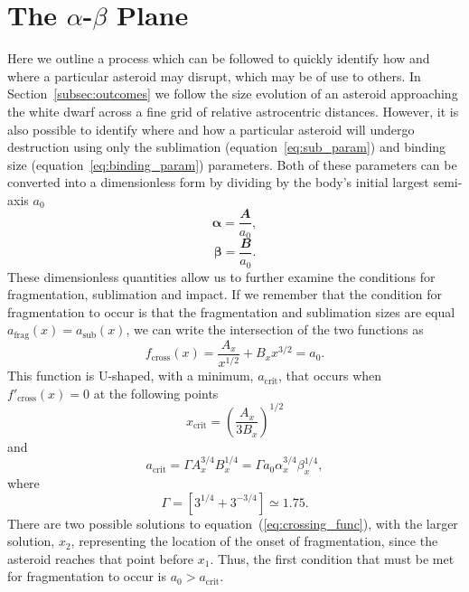 \documentclass[fleqn,usenatbib]{mnras}
\begin{document}
\section{The $\alpha$-$\beta$ Plane} \label{app:outcomes}
Here we outline a process which can be followed to quickly identify how and where a particular asteroid may disrupt, which may be of use to others.
In Section~\ref{subsec:outcomes} we follow the size evolution of an asteroid approaching the white dwarf across a fine grid of relative astrocentric distances.
However, it is also possible to identify where and how a particular asteroid will undergo destruction using only the sublimation (equation~\ref{eq:sub_param}) and binding size (equation~\ref{eq:binding_param}) parameters.
Both of these parameters can be converted into a dimensionless form by dividing by the body's initial largest semi-axis $a_0$
\begin{equation}
    \label{eq:dimenless_A}
    \boldsymbol{\alpha} = \frac{\mathbfit{A}}{a_0},
\end{equation}
\begin{equation}
    \label{eq:dimenless_B}
    \boldsymbol{\beta} = \frac{\mathbfit{B}}{a_0}.
\end{equation}
These dimensionless quantities allow us to further examine the conditions for fragmentation, sublimation and impact.
If we remember that the condition for fragmentation to occur is that the fragmentation and sublimation sizes are equal $a_\text{frag}(x) = a_\text{sub}(x)$, we can write the intersection of the two functions as
\begin{equation}
    \label{eq:crossing_func}
    f_\text{cross}(x) = \frac{A_x}{x^{1/2}} + B_x x^{3/2} = a_0.
\end{equation}
This function is U-shaped, with a minimum, $a_\text{crit}$, that occurs when $f'_\text{cross}(x) = 0$ at the following points
\begin{equation}
    \label{eq:xcrit}
    x_\text{crit} = \left(\frac{A_x}{3B_x} \right)^{1/2}
\end{equation}
and
\begin{equation}
    \label{eq:acrit}
    a_\text{crit} = \Gamma A_x^{3/4} B_x^{1/4} = \Gamma a_0 \alpha_x^{3/4} \beta_x^{1/4},
\end{equation}
where
\begin{equation}
    \Gamma = \left[ 3^{1/4} + 3^{-3/4} \right] \simeq 1.75.
\end{equation}
There are two possible solutions to equation~(\ref{eq:crossing_func}), with the larger solution, $x_2$, representing the location of the onset of fragmentation, since the asteroid reaches that point before $x_1$.
Thus, the first condition that must be met for fragmentation to occur is $a_0 > a_\text{crit}$.
\end{document}
